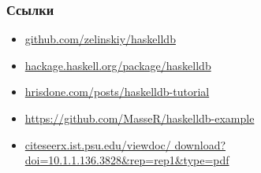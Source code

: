 \documentclass[12pt]{beamer}
\begin{document}
\begin{frame}[fragile]
\frametitle{Ссылки}
\begin{itemize}
\item \url{github.com/zelinskiy/haskelldb}
\item \url{hackage.haskell.org/package/haskelldb}
\item \url{hrisdone.com/posts/haskelldb-tutorial}
\item \url{https://github.com/MasseR/haskelldb-example}
\item \url{citeseerx.ist.psu.edu/viewdoc/
download?doi=10.1.1.136.3828&rep=rep1&type=pdf}

\end{itemize}
\end{frame}
\end{document}
